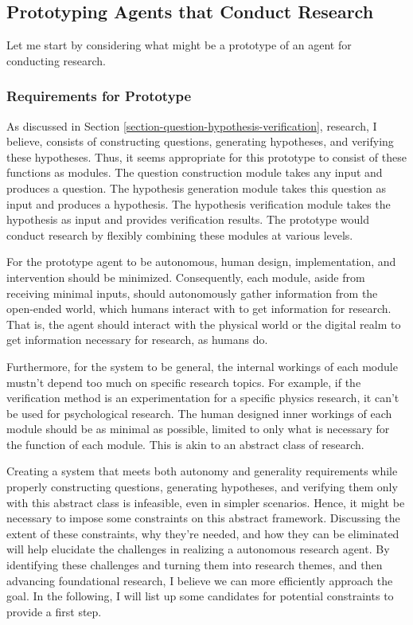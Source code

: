 \subsection{Prototyping Agents that Conduct Research}
Let me start by considering what might be a prototype of an agent for conducting research.

\subsubsection{Requirements for Prototype}
As discussed in Section \ref{section-question-hypothesis-verification}, research, I believe, consists of constructing questions, generating hypotheses, and verifying these hypotheses. Thus, it seems appropriate for this prototype to consist of these functions as modules. The question construction module takes any input and produces a question. The hypothesis generation module takes this question as input and produces a hypothesis. The hypothesis verification module takes the hypothesis as input and provides verification results. The prototype would conduct research by flexibly combining these modules at various levels.

For the prototype agent to be autonomous, human design, implementation, and intervention should be minimized. Consequently, each module, aside from receiving minimal inputs, should autonomously gather information from the open-ended world, which humans interact with to get information for research. That is, the agent should interact with the physical world or the digital realm to get information necessary for research, as humans do.


Furthermore, for the system to be general, the internal workings of each module mustn't depend too much on specific research topics. For example, if the verification method is an experimentation for a specific physics research, it can't be used for psychological research. The human designed inner workings of each module should be as minimal as possible, limited to only what is necessary for the function of each module. This is akin to an abstract class of research.

Creating a system that meets both autonomy and generality requirements while properly constructing questions, generating hypotheses, and verifying them only with this abstract class is infeasible, even in simpler scenarios. Hence, it might be necessary to impose some constraints on this abstract framework. Discussing the extent of these constraints, why they're needed, and how they can be eliminated will help elucidate the challenges in realizing a autonomous research agent. By identifying these challenges and turning them into research themes, and then advancing foundational research, I believe we can more efficiently approach the goal. In the following, I will list up some candidates for potential constraints to provide a first step.

